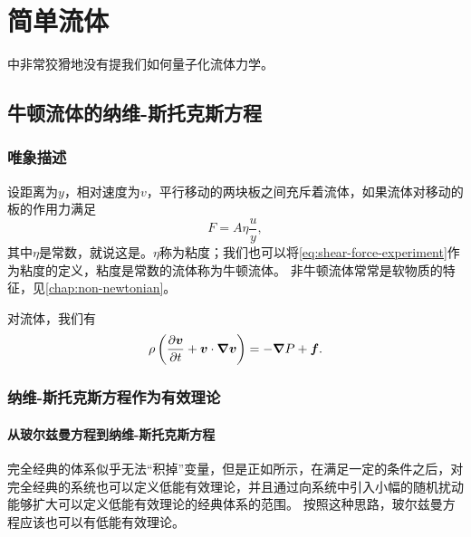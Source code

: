\part{简单流体}

\cite{eft-fluid-rel}中非常狡猾地没有提我们如何量子化流体力学。

\chapter{牛顿流体的纳维-斯托克斯方程}

\section{唯象描述}

设距离为$y$，相对速度为$v$，平行移动的两块板之间充斥着流体，如果流体对移动的板的作用力满足
\begin{equation}
    F = A \eta \frac{u}{y},
    \label{eq:shear-force-experiment}
\end{equation}
其中$\eta$是常数，就说这是。$\eta$称为粘度；我们也可以将\eqref{eq:shear-force-experiment}作为粘度的定义，粘度是常数的流体称为牛顿流体。
非牛顿流体常常是软物质的特征，见\autoref{chap:non-newtonian}。

对流体，我们有
\begin{equation}
    \rho \left( \pdv{\vb*{v}}{t} + \vb*{v} \cdot \grad{\vb*{v}} \right) = - \grad{P} + \vb*{f}.
\end{equation}

\section{纳维-斯托克斯方程作为有效理论}

\subsection{从玻尔兹曼方程到纳维-斯托克斯方程}\label{sec:from-boltmann-to-ns}

完全经典的体系似乎无法“积掉”变量，但是正如\cite{reall2021effective}所示，在满足一定的条件之后，对完全经典的系统也可以定义低能有效理论，并且通过向系统中引入小幅的随机扰动能够扩大可以定义低能有效理论的经典体系的范围。
按照这种思路，玻尔兹曼方程应该也可以有低能有效理论。

